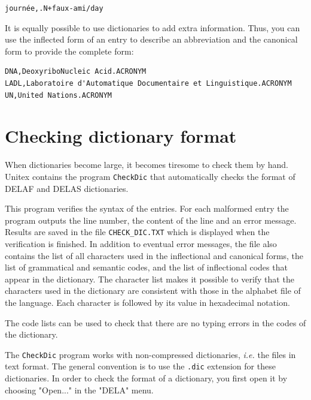 \noindent
\texttt{journ\'ee,.N+faux-ami/day}


\bigskip
\noindent It is equally possible to use dictionaries to add extra information.
Thus, you can use the inflected form of an entry to describe an abbreviation and the
canonical form to provide the complete form:

\bigskip
\begin{verbatim}
DNA,DeoxyriboNucleic Acid.ACRONYM
LADL,Laboratoire d'Automatique Documentaire et Linguistique.ACRONYM
UN,United Nations.ACRONYM
\end{verbatim}

\section{Checking dictionary format}
 
When dictionaries become large, it becomes tiresome to check them by hand.
Unitex contains the program \verb+CheckDic+ that automatically checks the
format of DELAF and DELAS dictionaries.

\bigskip
\noindent This program verifies the syntax of the entries. For each malformed
entry the program outputs the line number, the content of the line and an error
message. Results are saved in the file
\verb+CHECK_DIC.TXT+ which is displayed when the
verification is finished. In addition to eventual error messages, the file also
contains the list of all characters used in the inflectional and canonical forms,
the list of grammatical and semantic codes, and the list of inflectional codes
that appear in the dictionary. The character list makes it possible to verify
that the characters used in the dictionary are consistent with those in the 
alphabet file of the language. Each character is followed by its value in hexadecimal
notation.

\bigskip
\noindent The code lists can be used to check that there are no typing errors 
in the codes of the dictionary.

\bigskip
\noindent The \verb+CheckDic+ program works with non-compressed dictionaries,
\textit{i.e.} the files in text format. The general convention is to use the
\verb+.dic+ extension for these dictionaries. In order to check the 
 format of a
dictionary, you first open it by choosing "Open..." in the "DELA" menu.

